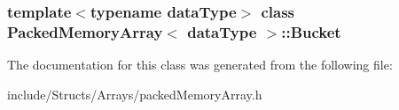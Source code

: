 \subsubsection*{template$<$typename dataType$>$ class PackedMemoryArray$<$ dataType $>$::Bucket}



The documentation for this class was generated from the following file:\begin{DoxyCompactItemize}
\item 
include/Structs/Arrays/packedMemoryArray.h\end{DoxyCompactItemize}
